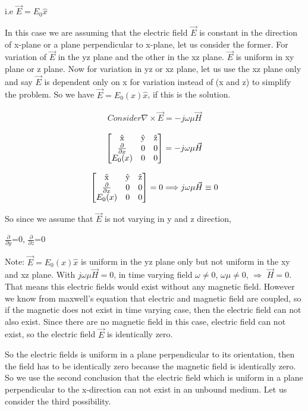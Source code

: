 i.e $\vec{E}={E_{0}}\hat{x}$

In this case we are assuming that the electric field $\vec{E}$ is constant in the direction of x-plane or a plane perpendicular to x-plane, let us consider the former. For variation of $\vec{E}$ in the yz plane and the other in the xz plane. $\vec{E}$ is uniform in xy plane or z plane. Now for variation in yz or xz plane, let us use the xz plane only and say $\vec{E}$ is dependent only on x for variation instead of (x and z) to simplify the problem. So we have $\vec{E}={E_{0}(x)}\hat{x}$, if this is the solution.

\begin{align}
Consider \nabla\times\vec{E}=-j\omega\mu\vec{H}
\end{align}


\[
\begin{bmatrix}
$\^{x}$ & $\^{y}$ & $\^{z}$\\
$$\frac{\partial}{\partial x}$$ & 0 & 0\\
$$E_{0}(x)$$ & 0 & 0
\end{bmatrix} =
-j\omega \mu \vec{H}
\]




\[
\begin{bmatrix}
$\^{x}$ & $\^{y}$ & $\^{z}$\\
$$\frac{\partial}{\partial x}$$ & 0 & 0\\
$$E_{0}(x)$$ & 0 & 0
\end{bmatrix} =0 \Longrightarrow j\omega\mu\vec{H}\equiv0
\]

So since we assume that $\vec{E}$ is not varying in y and z direction,

$\frac{\partial}{\partial y}$=0,
$\frac{\partial}{\partial z}$=0

Note:  $\vec{E}={E_{0}(x)\hat{x}}$ is uniform in the yz plane only but not uniform in the xy and xz plane. With $j\omega\mu\vec{H}=0$, in time varying field $\omega\neq0$, $\omega\mu\neq0$, $\Longrightarrow$ $\vec{H}=0$. That means this electric fields would exist without any magnetic field. However we know from maxwell's equation that electric and magnetic field are coupled, so if the magnetic does not exist in time varying case, then the electric field can not also exist. Since there are no magnetic field in this case, electric field can not exist, so the electric field $\vec{E}$ is identically zero.

So the electric fields is uniform in a plane perpendicular to its orientation, then the field has to be identically zero because the magnetic field is identically zero. So we use the second conclusion that the electric field which is uniform in a plane perpendicular to the x-direction can not exist in an unbound medium. Let us consider the third possibility.

